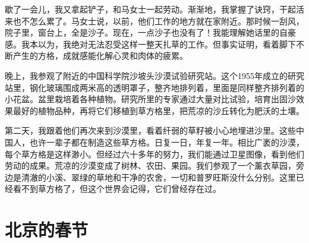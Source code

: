 \documentclass[12pt,UTF-8,openany]{ctexbook}
\begin{document}
\begin{large}
    歇了一会儿，我又拿起铲子，和马女士一起劳动。渐渐地，我掌握了诀窍，干起活来也不怎么累了。马女士说，以前，他们工作的地方就在家附近。那时候一刮风，院子里，窗台上，全是沙子。现在，一点沙子也没有了！我能理解她话里的自豪感。我本以为，我绝对无法忍受这样一整天扎草的工作。但事实证明，看着脚下不断产生的方格，成就感能化解心灵和肉体的疲累。
    
    晚上，我参观了附近的中国科学院沙坡头沙漠试验研究站。这个1955年成立的研究站里，钢化玻璃围成两米高的透明罩子，整齐地排列着，里面是同样整齐排列着的小花盆。盆里栽培着各种植物。研究所里的专家通过大量对比试验，培育出固沙效果最好的植物品种，再将它们移植到草方格里，把荒凉的沙丘转化为肥沃的土壤。
    
    第二天，我跟着他们再次来到沙漠里，看着纤弱的草籽被小心地埋进沙里。这些中国人，也许一辈子都在制造这些草方格。日复一日，年复一年。相比广袤的沙漠，每个草方格是这样渺小。但经过六十多年的努力，我们能通过卫星图像，看到他们劳动的成果。荒凉的沙漠变成了树林、农田、果园。我们参观了一个薰衣草园，旁边是清澈的小溪、翠绿的草地和干净的农舍，一切和普罗旺斯没什么分别。这里已经看不到草方格了，但这个世界会记得，它们曾经存在过。
    
\end{large}



\chapter{北京的春节}
\end{document}

